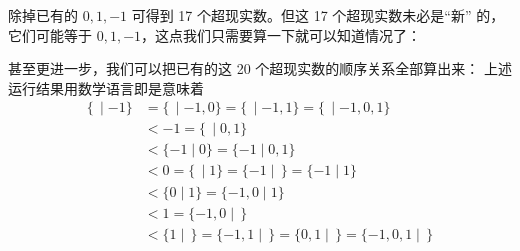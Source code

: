 \documentclass[cs4size,a4paper,adobefonts]{ctexart}
\numberwithin{equation}{section}
\begin{document}
除掉已有的 $0,1,-1$ 可得到 17 个超现实数。但这 17 个超现实数未必是“新”
的，它们可能等于 $0,1,-1$，这点我们只需要算一下就可以知道情况了：

甚至更进一步，我们可以把已有的这 20 个超现实数的顺序关系全部算出来：
上述运行结果用数学语言即是意味着
\begin{equation}
  \begin{split}
    \{\,\mid-1\} &=\{\,\mid-1,0\}=\{\,\mid-1,1\}=\{\,\mid-1,0,1\} \\
    &< -1 =\{\,\mid0,1\}\\
    &< \{-1\mid0\}=\{-1\mid0,1\}\\
    &< 0=\{\,\mid1\}=\{-1\mid\,\}=\{-1\mid1\}\\
    &< \{0\mid1\}=\{-1,0\mid1\}\\
    &< 1=\{-1,0\mid\,\}\\
    &< \{1\mid\,\}=\{-1,1\mid\,\}=\{0,1\mid\,\}=\{-1,0,1\mid\,\}
  \end{split}
\end{equation}
\end{document}
